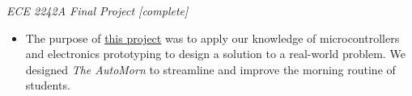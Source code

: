 \documentclass[
]{article}
\begin{document}
\emph{ECE 2242A Final Project {[}complete{]}}

\begin{itemize}
      \item
            The purpose of
            \href{file:///G:/Applications/Resumes/•\%09https:/drive.google.com/file/d/1vDwskj48cE9Amr8lPI0j0d2goCWOxL-1/view\%3fusp=sharing}{this
                  project} was to apply our knowledge of microcontrollers and
            electronics prototyping to design a solution to a real-world problem.
            We designed \emph{The AutoMorn} to streamline and improve the morning
            routine of students.
\end{itemize}
\end{document}
